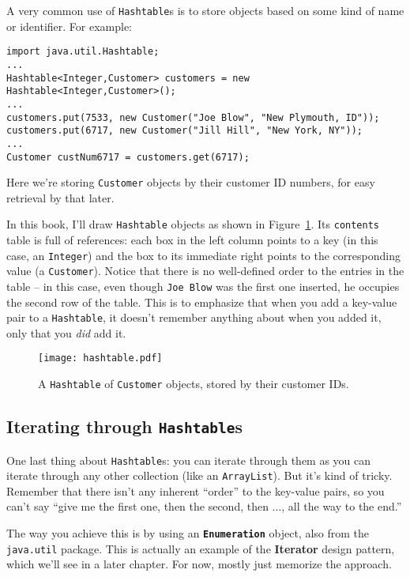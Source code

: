 A very common use of \texttt{Hashtable}s is to store objects based on some
kind of name or identifier. For example:

\begin{Verbatim}[fontsize=\scriptsize,samepage=true,frame=single]
import java.util.Hashtable;
...
Hashtable<Integer,Customer> customers = new Hashtable<Integer,Customer>();
...
customers.put(7533, new Customer("Joe Blow", "New Plymouth, ID"));
customers.put(6717, new Customer("Jill Hill", "New York, NY"));
...
Customer custNum6717 = customers.get(6717);
\end{Verbatim}

Here we're storing \texttt{Customer} objects by their customer ID numbers, for
easy retrieval by that later.

In this book, I'll draw \texttt{Hashtable} objects as shown in
Figure~\ref{fig:hashtable}. Its \texttt{contents} table is full of references:
each box in the left column points to a key (in this case, an
\texttt{Integer}) and the box to its immediate right points to the
corresponding value (a \texttt{Customer}). Notice that there is no
well-defined order to the entries in the table -- in this case, even though
\texttt{Joe Blow} was the first one inserted, he occupies the second row of
the table. This is to emphasize that when you add a key-value pair to a
\texttt{Hashtable}, it doesn't remember anything about when you added it, only
that you \textit{did} add it.

\begin{figure}[ht]
\centering
\texttt{[image: hashtable.pdf]}
\caption{A \texttt{Hashtable} of \texttt{Customer} objects, stored by their
customer IDs.}
\label{fig:hashtable}
\end{figure}

\subsection{Iterating through \texttt{Hashtable}s}

One last thing about \texttt{Hashtable}s: you can iterate through them as you
can iterate through any other collection (like an \texttt{ArrayList}). But
it's kind of tricky. Remember that there isn't any inherent ``order'' to the
key-value pairs, so you can't say ``give me the first one, then the second,
then ..., all the way to the end.''

The way you achieve this is by using an \textbf{\texttt{Enumeration}} object,
also from the \texttt{java.util} package. This is actually an example of the
\textbf{Iterator} design pattern, which we'll see in a later chapter. For now,
mostly just memorize the approach.

